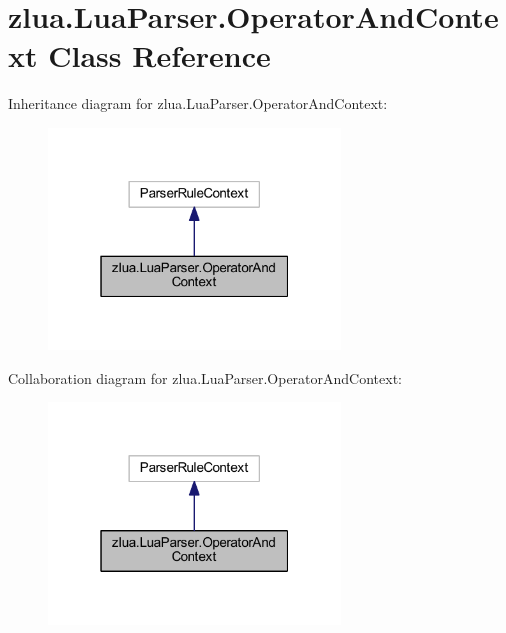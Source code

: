 \hypertarget{classzlua_1_1_lua_parser_1_1_operator_and_context}{}\section{zlua.\+Lua\+Parser.\+Operator\+And\+Context Class Reference}
\label{classzlua_1_1_lua_parser_1_1_operator_and_context}


Inheritance diagram for zlua.\+Lua\+Parser.\+Operator\+And\+Context\+:
\nopagebreak
\begin{figure}[H]
\begin{center}
\leavevmode
\includegraphics[width=220pt]{classzlua_1_1_lua_parser_1_1_operator_and_context__inherit__graph}
\end{center}
\end{figure}


Collaboration diagram for zlua.\+Lua\+Parser.\+Operator\+And\+Context\+:
\nopagebreak
\begin{figure}[H]
\begin{center}
\leavevmode
\includegraphics[width=220pt]{classzlua_1_1_lua_parser_1_1_operator_and_context__coll__graph}
\end{center}
\end{figure}
